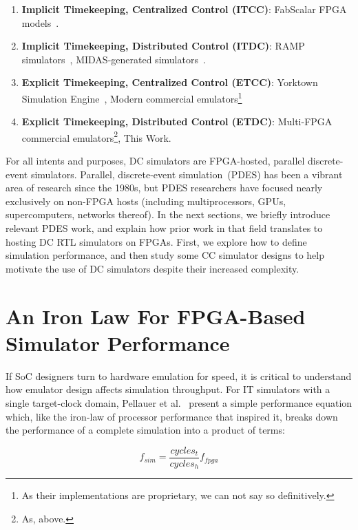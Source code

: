 \begin{enumerate}
\item\textbf{Implicit Timekeeping, Centralized Control (ITCC)}: FabScalar FPGA models~\cite{fabscalarfpga}.

\item\textbf{Implicit Timekeeping, Distributed Control (ITDC)}: RAMP simulators~\cite{RAMPGold, HASim}, MIDAS-generated simulators~\cite{FireSim}.

\item\textbf{Explicit Timekeeping, Centralized Control (ETCC)}: Yorktown Simulation Engine~\cite{YSESoftware}, Modern commercial emulators\footnote{As their implementations are proprietary, we can not say so definitively.}

\item\textbf{Explicit Timekeeping, Distributed Control (ETDC)}: Multi-FPGA commercial emulators\footnote{As, above.}, This Work.
\end{enumerate}

For all intents and purposes, DC simulators are FPGA-hosted, parallel
discrete-event simulators.  Parallel, discrete-event simulation~(PDES) has been
a vibrant area of research since the 1980s, but PDES researchers have focused
nearly exclusively on non-FPGA hosts (including multiprocessors, GPUs,
supercomputers, networks thereof).  In the next sections, we briefly introduce
relevant PDES work, and explain how prior work in that field translates to
hosting DC RTL simulators on FPGAs. First, we explore how to define simulation
performance, and then study some CC simulator designs to help motivate the use
of DC simulators despite their increased complexity.

\section{An Iron Law For FPGA-Based Simulator Performance}

If SoC designers turn to hardware emulation for speed, it is critical
to understand how emulator design affects simulation throughput. For IT simulators with a single target-clock domain, Pellauer et al.~\cite{APortNetworks} present a simple performance
equation which, like the iron-law of processor performance that inspired it,
breaks down the performance of a complete simulation into a product of terms:

\begin{equation}
    f_{sim} = \frac{cycles_{t}}{cycles_{h}} f_{fpga}
\end{equation}\label{eq:sim-perf}

